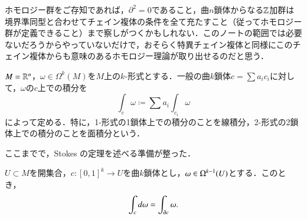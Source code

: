 \begin{dig}
ホモロジー群をご存知であれば，$\partial^2 = 0$であること，曲$n$鎖体からなる$\mathbb{Z}$加群は境界準同型と合わせてチェイン複体の条件を全て充たすこと（従ってホモロジー群が定義できること）まで察しがつくかもしれない．このノートの範囲では必要ないだろうからやっていないだけで，おそらく特異チェイン複体と同様にこのチェイン複体からも意味のあるホモロジー理論が取り出せるのだと思う．
\end{dig}

\begin{defi}
$M=\mathbb{R}^n$，$\omega \in \Omega^k(M)$を$M$上の$k$-形式とする．一般の曲$k$鎖体$c = \sum a_i c_i$に対して，$\omega$の$c$上での積分を
\begin{equation}
\int_c \omega \coloneqq \sum a_i \int_{c_i} \omega
\end{equation}によって定める．特に，1-形式の1鎖体上での積分のことを線積分，2-形式の2鎖体上での積分のことを面積分という．
\end{defi}

ここまでで，Stokes の定理を述べる準備が整った．

\begin{thm}[Stokes]

$U \subset M$を開集合，$c \colon [0,1]^k \to U$を曲$k$鎖体とし，$\omega \in \Omega^{k-1}(U)$とする．このとき，
\begin{equation}
\int_{c} \mathop{}\!d \omega = \int_{\partial c} \omega.
\end{equation}
\end{thm}

